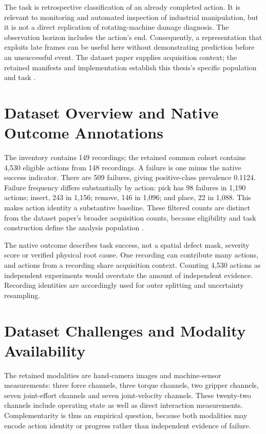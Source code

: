 The task is retrospective classification of an already completed action. It is relevant to monitoring and automated inspection of industrial manipulation, but it is not a direct replication of rotating-machine damage diagnosis. The observation horizon includes the action's end. Consequently, a representation that exploits late frames can be useful here without demonstrating prediction before an unsuccessful event. The dataset paper supplies acquisition context; the retained manifests and implementation establish this thesis's specific population and task \parencite{Sliwowski2025REASSEMBLE}.

\section{Dataset Overview and Native Outcome Annotations}
The inventory contains 149 recordings; the retained common cohort contains 4,530 eligible actions from 148 recordings. A failure is one minus the native success indicator. There are 509 failures, giving positive-class prevalence 0.1124. Failure frequency differs substantially by action: pick has 98 failures in 1,190 actions; insert, 243 in 1,156; remove, 146 in 1,096; and place, 22 in 1,088. This makes action identity a substantive baseline. These filtered counts are distinct from the dataset paper's broader acquisition counts, because eligibility and task construction define the analysis population \citep{Sliwowski2025REASSEMBLE}.

The native outcome describes task success, not a spatial defect mask, severity score or verified physical root cause. One recording can contribute many actions, and actions from a recording share acquisition context. Counting 4,530 actions as independent experiments would overstate the amount of independent evidence. Recording identities are accordingly used for outer splitting and uncertainty resampling.

\section{Dataset Challenges and Modality Availability}
The retained modalities are hand-camera images and machine-sensor measurements: three force channels, three torque channels, two gripper channels, seven joint-effort channels and seven joint-velocity channels. These twenty-two channels include operating state as well as direct interaction measurements. Complementarity is thus an empirical question, because both modalities may encode action identity or progress rather than independent evidence of failure.


